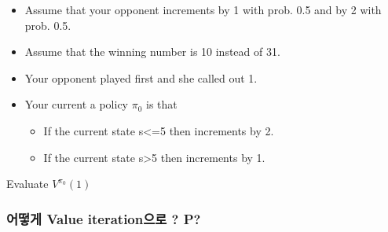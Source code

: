 \documentclass[
  a4paper]{article}
\providecommand{\tightlist}{%
  \setlength{\itemsep}{0pt}\setlength{\parskip}{0pt}}
\begin{document}
\begin{itemize}
\tightlist
\item
  Assume that your opponent increments by 1 with prob. 0.5 and by 2 with
  prob. 0.5.
\item
  Assume that the winning number is 10 instead of 31.
\item
  Your opponent played first and she called out 1.
\item
  Your current a policy \(\pi_{0}\) is that

  \begin{itemize}
  \tightlist
  \item
    If the current state s\textless=5 then increments by 2.
  \item
    If the current state s\textgreater5 then increments by 1.
  \end{itemize}
\end{itemize}

Evaluate \(V^{\pi_{0}}(1)\)

\hypertarget{uxc5b4uxb5bbuxac8c-value-iterationuxc73cuxb85c-p}{%
\subsubsection{어떻게 Value iteration으로 ?
P?}\label{uxc5b4uxb5bbuxac8c-value-iterationuxc73cuxb85c-p}}
\end{document}
